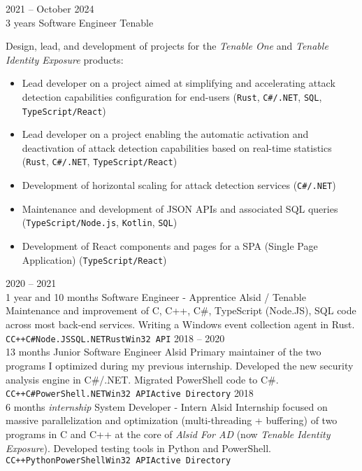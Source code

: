 \documentclass[8pt]{developercv} %
\begin{document}
\begin{entrylist}
	\entry
		{2021 -- October 2024\\\footnotesize{3 years}}
		{Software Engineer}
		{Tenable}
		{
            Design, lead, and development of projects for the \emph{Tenable One} and \emph{Tenable Identity Exposure} products:
            \begin{itemize}
				\item Lead developer on a project aimed at simplifying and accelerating attack detection capabilities configuration for end-users (\texttt{Rust}, \texttt{C\#/.NET}, \texttt{SQL}, \texttt{TypeScript/React})
				\item Lead developer on a project enabling the automatic activation and deactivation of attack detection capabilities based on real-time statistics (\texttt{Rust}, \texttt{C\#/.NET}, \texttt{TypeScript/React})
				\item Development of horizontal scaling for attack detection services (\texttt{C\#/.NET})
				\item Maintenance and development of JSON APIs and associated SQL queries (\texttt{TypeScript/Node.js}, \texttt{Kotlin}, \texttt{SQL})
				\item Development of React components and pages for a SPA (Single Page Application) (\texttt{TypeScript/React})
            \end{itemize}
		}
	\entry
		{2020 -- 2021\\\footnotesize{1 year and 10 months}}
		{Software Engineer - Apprentice}
		{Alsid / Tenable}
		{
			Maintenance and improvement of C, C++, C\#, TypeScript (Node.JS), SQL code across most back-end services. Writing a Windows event collection agent in Rust\footnotemark[1].\\
			\texttt{C}\slashsep\texttt{C++}\slashsep\texttt{C\#}\slashsep\texttt{Node.JS}\slashsep\texttt{SQL}\slashsep\texttt{.NET}\slashsep\texttt{Rust}\slashsep\texttt{Win32 API}
		}
	\entry
		{2018 -- 2020\\\footnotesize{13 months}}
		{Junior Software Engineer}
		{Alsid}
		{
			Primary maintainer of the two programs I optimized during my previous internship. Developed the new security analysis engine in C\#/.NET. Migrated PowerShell code to C\#.\\
			\texttt{C}\slashsep\texttt{C++}\slashsep\texttt{C\#}\slashsep\texttt{PowerShell}\slashsep\texttt{.NET}\slashsep\texttt{Win32 API}\slashsep\texttt{Active Directory}
		}
	\entry
		{2018\\\footnotesize{6 months \emph{internship}}}
		{System Developer  - Intern}
		{Alsid}
		{
			Internship focused on massive parallelization and optimization (multi-threading + buffering) of two programs in C and C++ at the core of \emph{Alsid For AD} (now \emph{Tenable Identity Exposure}).
			Developed testing tools in Python and PowerShell.\\
			\texttt{C}\slashsep\texttt{C++}\slashsep\texttt{Python}\slashsep\texttt{PowerShell}\slashsep\texttt{Win32 API}\slashsep\texttt{Active Directory}
		}
\end{entrylist}
\end{document}
